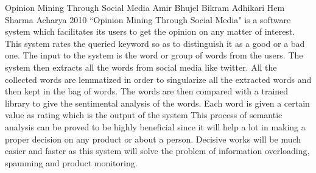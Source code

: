 \begin{conf-abstract}[]
{Opinion Mining Through Social Media}
{ 
Amir Bhujel
Bikram Adhikari
Hem Sharma Acharya
}
{2010}
``Opinion Mining Through Social Media" is a software system which facilitates its users to get the opinion on any matter of interest. This system rates the queried keyword so as to distinguish it as a good or a bad one. The input to the system is the word or group of words from the users. The system then extracts all the words from social media like twitter. All the collected words are lemmatized in order to singularize all the extracted words and then kept in the bag of words. The words are then compared with a trained library to give the sentimental analysis of the words. Each word is given a certain value as rating which is the output of the system This process of semantic analysis can be proved to be highly beneficial since it will help a lot in making a proper decision on any product or about a person. Decisive works will be much easier and faster as this system will solve the problem of information overloading, spamming and product monitoring.
\end{conf-abstract}	